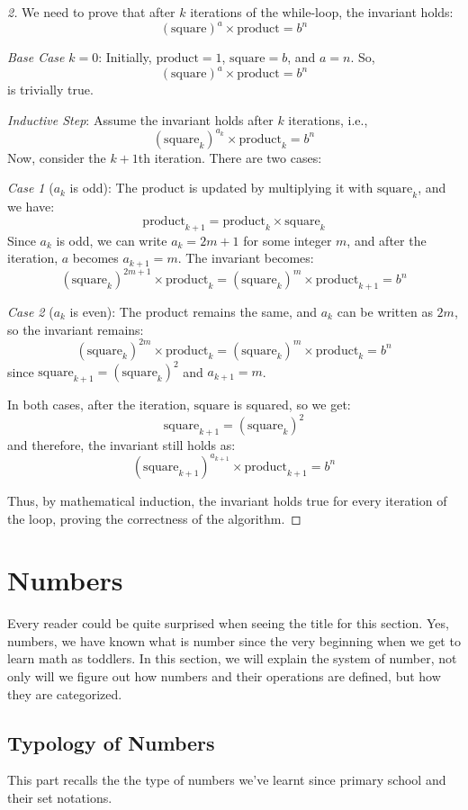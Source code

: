\documentclass[
	12pt, %
	fleqn, %
	a4paper, %
]{LegrandOrangeBook}
\begin{document}
\begin{proof}[2]
    We need to prove that after \(k\) iterations of the while-loop, the invariant holds:
\[
(\text{square})^a \times \text{product} = b^n
\]

\textit{Base Case} \(k=0\):
Initially, \(\text{product} = 1\), \(\text{square} = b\), and \(a = n\). So,
\[
(\text{square})^a \times \text{product} = b^n
\]
is trivially true.

\textit{Inductive Step}:
Assume the invariant holds after \(k\) iterations, i.e.,
\[
(\text{square}_k)^{a_k} \times \text{product}_k = b^n
\]
Now, consider the \(k+1\)th iteration. There are two cases:

\textit{Case 1} (\(a_k\) is odd):
The product is updated by multiplying it with \(\text{square}_k\), and we have:
\[
\text{product}_{k+1} = \text{product}_k \times \text{square}_k
\]
Since \(a_k\) is odd, we can write \(a_k = 2m + 1\) for some integer \(m\), and after the iteration, \(a\) becomes \(a_{k+1} = m\). The invariant becomes:
\[
(\text{square}_k)^{2m+1} \times \text{product}_k = (\text{square}_k)^m \times \text{product}_{k+1} = b^n
\]

\textit{Case 2} (\(a_k\) is even):
The product remains the same, and \(a_k\) can be written as \(2m\), so the invariant remains:
\[
(\text{square}_k)^{2m} \times \text{product}_k = (\text{square}_k)^m \times \text{product}_k = b^n
\]
since \(\text{square}_{k+1} = (\text{square}_k)^2\) and \(a_{k+1} = m\).

In both cases, after the iteration, \(\text{square}\) is squared, so we get:
\[
\text{square}_{k+1} = (\text{square}_k)^2
\]
and therefore, the invariant still holds as:
\[
(\text{square}_{k+1})^{a_{k+1}} \times \text{product}_{k+1} = b^n
\]

Thus, by mathematical induction, the invariant holds true for every iteration of the loop, proving the correctness of the algorithm.
\end{proof}
\section{Numbers}
Every reader could be quite surprised when seeing the title for this section. Yes, numbers, we have known what is number since the very beginning when we get to learn math as toddlers. In this section, we will explain the system of number, not only will we figure out how numbers and their operations are defined, but how they are categorized.
\subsection{Typology of Numbers}
This part recalls the the type of numbers we've learnt since primary school and their set notations.
\end{document}
